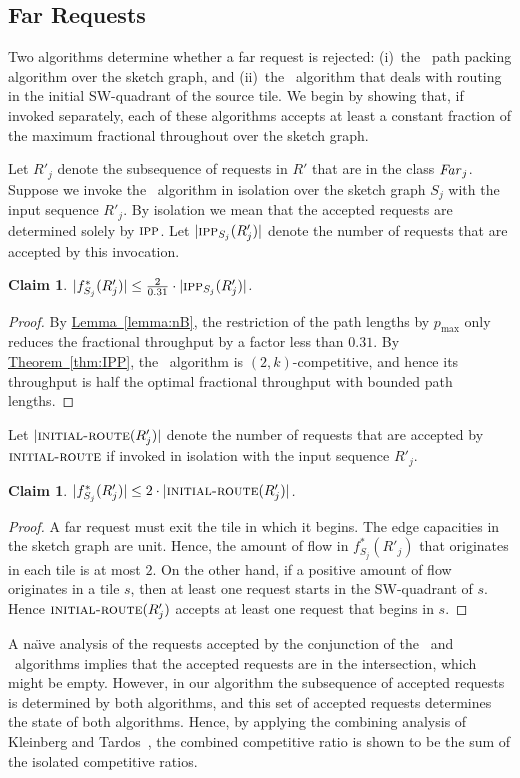 \documentclass[11pt]{article}
\newtheorem{claim}[theorem]{Claim}
\newcommand{\namedref}[2]{\hyperref[#2]{#1~\ref*{#2}}}
\newcommand{\theoremref}[1]{\namedref{Theorem}{#1}}
\newcommand{\lemmaref}[1]{\namedref{Lemma}{#1}}
\newcommand{\route}{\text{\sc{ipp}}\xspace}
\newcommand{\IPP}{\route}
\newcommand{\initroute}{\text{\sc{initial-route}}\xspace}
\newcommand{\pmax}{p_{\max}}
\newenvironment{proof sketch}[1]{\noindent {\emph{Proof sketch of #1:}}}{\hfill \qed}
\newcommand{\far}{\text{\emph{Far}}\xspace}
\begin{document}
\subsection{Far Requests}
Two algorithms determine whether a far request is rejected: (i)~the \IPP\ path
packing algorithm over the sketch graph, and (ii)~the \initroute\ algorithm that
deals with routing in the initial SW-quadrant of the source tile. We begin by showing
that, if invoked separately, each of these algorithms accepts at least a constant
fraction of the maximum fractional throughout over the sketch graph.

Let $R'_j$ denote the subsequence of requests in $R'$ that are in the class $\far_j$.
Suppose we invoke the \IPP\ algorithm in isolation over the sketch graph $S_j$ with
the input sequence $R'_j$. By isolation we mean that the accepted requests are
determined solely by $\IPP$. Let $|\IPP_{S_j}(R'_j)|$ denote the number of requests
that are accepted by this invocation.
\begin{claim}\label{claim:IPP}
$|f^*_{S_j}(R'_j)| \leq \frac{2}{0.31} \cdot  |\IPP_{S_j}(R'_j)| $.
\end{claim}
\begin{proof}
  By \lemmaref{lemma:nB}, the restriction of the path lengths by $\pmax$ only reduces
  the fractional throughput by a factor less than $0.31$.  By \theoremref{thm:IPP}, the \IPP\
  algorithm is $(2,k)$-competitive, and hence its throughput is half the optimal
  fractional throughput with bounded path lengths.
\end{proof}

Let $|\initroute(R'_j)|$ denote the number of requests
that are accepted by $\initroute$ if invoked in isolation with
the input sequence $R'_j$.
\begin{claim}\label{claim:init}
$|f^*_{S_j}(R'_j)| \leq 2 \cdot |\initroute(R'_j)| $.
\end{claim}
\begin{proof}
  A far request must exit the tile in which it begins.  The edge capacities in the
  sketch graph are unit. Hence, the amount of flow in $f^*_{S_j}(R'_j)$ that
  originates in each tile is at most $2$.  On the other hand, if a positive amount of
  flow originates in a tile $s$, then at least one request starts in the SW-quadrant
  of $s$. Hence $\initroute(R'_j)$ accepts at least one request that begins in $s$.
\end{proof}

A na\"{\i}ve analysis of the requests accepted by the
conjunction of the \IPP\ and \initroute\ algorithms implies
that the accepted requests are in the intersection, which
might be empty. However, in our algorithm the subsequence
of accepted requests is determined by both algorithms, and
this set of accepted requests determines the state of both
algorithms. Hence, by applying the combining analysis of
Kleinberg and Tardos~\cite{KT}, the combined competitive
ratio is shown to be the sum of the isolated competitive
ratios.
\end{document}
